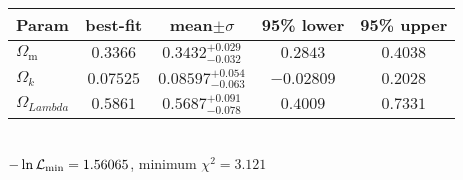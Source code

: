 \begin{tabular}{|l|c|c|c|c|} 
 \hline 
Param & best-fit & mean$\pm\sigma$ & 95\% lower & 95\% upper \\ \hline 
$\Omega_\mathrm{m}$ &$0.3366$ & $0.3432_{-0.032}^{+0.029}$ & $0.2843$ & $0.4038$ \\ 
$\Omega{}_{k }$ &$0.07525$ & $0.08597_{-0.063}^{+0.054}$ & $-0.02809$ & $0.2028$ \\ 
$\Omega{}_{Lambda }$ &$0.5861$ & $0.5687_{-0.078}^{+0.091}$ & $0.4009$ & $0.7331$ \\ 
\hline 
 \end{tabular} \\ 
$-\ln{\cal L}_\mathrm{min} =1.56065$, minimum $\chi^2=3.121$ \\ 
